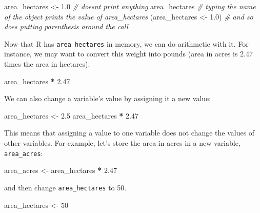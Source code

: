 \documentclass[
]{book}
\newenvironment{Shaded}{\begin{snugshade}}{\end{snugshade}}
\newcommand{\CommentTok}[1]{\textcolor[rgb]{0.56,0.35,0.01}{\textit{#1}}}
\newcommand{\DecValTok}[1]{\textcolor[rgb]{0.00,0.00,0.81}{#1}}
\newcommand{\FloatTok}[1]{\textcolor[rgb]{0.00,0.00,0.81}{#1}}
\newcommand{\NormalTok}[1]{#1}
\newcommand{\OtherTok}[1]{\textcolor[rgb]{0.56,0.35,0.01}{#1}}
\newcommand{\SpecialCharTok}[1]{\textcolor[rgb]{0.81,0.36,0.00}{\textbf{#1}}}
\begin{document}
\begin{Shaded}
\begin{Highlighting}[]
\NormalTok{area\_hectares }\OtherTok{\textless{}{-}} \FloatTok{1.0}    \CommentTok{\# doesn\textquotesingle{}t print anything}
\NormalTok{area\_hectares           }\CommentTok{\# typing the name of the object prints the value of \textasciigrave{}area\_hectares\textasciigrave{}}
\NormalTok{(area\_hectares }\OtherTok{\textless{}{-}} \FloatTok{1.0}\NormalTok{)  }\CommentTok{\# and so does putting parenthesis around the call }
\end{Highlighting}
\end{Shaded}

Now that R has \texttt{area\_hectares} in memory, we can do arithmetic with it. For
instance, we may want to convert this weight into pounds (area in acres is 2.47 times the area in hectares):

\begin{Shaded}
\begin{Highlighting}[]
\NormalTok{area\_hectares  }\SpecialCharTok{*} \FloatTok{2.47}
\end{Highlighting}
\end{Shaded}

We can also change a variable's value by assigning it a new value:

\begin{Shaded}
\begin{Highlighting}[]
\NormalTok{area\_hectares }\OtherTok{\textless{}{-}} \FloatTok{2.5}
\NormalTok{area\_hectares }\SpecialCharTok{*} \FloatTok{2.47}
\end{Highlighting}
\end{Shaded}

This means that assigning a value to one variable does not change the values of
other variables. For example, let's store the area in acres in a new
variable, \texttt{area\_acres}:

\begin{Shaded}
\begin{Highlighting}[]
\NormalTok{area\_acres }\OtherTok{\textless{}{-}}\NormalTok{ area\_hectares }\SpecialCharTok{*} \FloatTok{2.47}
\end{Highlighting}
\end{Shaded}

and then change \texttt{area\_hectares} to 50.

\begin{Shaded}
\begin{Highlighting}[]
\NormalTok{area\_hectares }\OtherTok{\textless{}{-}} \DecValTok{50}
\end{Highlighting}
\end{Shaded}
\end{document}

